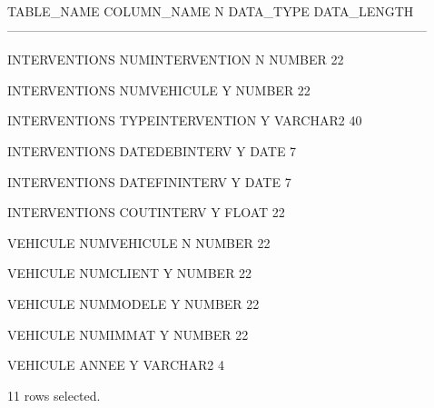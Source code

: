 \documentclass[•]{article}
\begin{document}
\begin{sql}
 TABLE_NAME                     COLUMN_NAME                    N		DATA_TYPE		DATA_LENGTH
---------------------------------------------------------------------------------------------------

INTERVENTIONS                   NUMINTERVENTION                N		NUMBER	         22

INTERVENTIONS                   NUMVEHICULE                    Y		NUMBER	         22

INTERVENTIONS                   TYPEINTERVENTION               Y		VARCHAR2         40

INTERVENTIONS                   DATEDEBINTERV                  Y		DATE	          7

INTERVENTIONS                   DATEFININTERV                  Y		DATE	          7

INTERVENTIONS                   COUTINTERV                     Y		FLOAT	         22

VEHICULE                        NUMVEHICULE                    N		NUMBER	         22

VEHICULE                        NUMCLIENT                      Y		NUMBER	         22

VEHICULE                        NUMMODELE                      Y		NUMBER	         22

VEHICULE                        NUMIMMAT                       Y		NUMBER	         22

VEHICULE                        ANNEE                          Y		VARCHAR2	      4

11 rows selected.
\end{sql}

\end{document}
